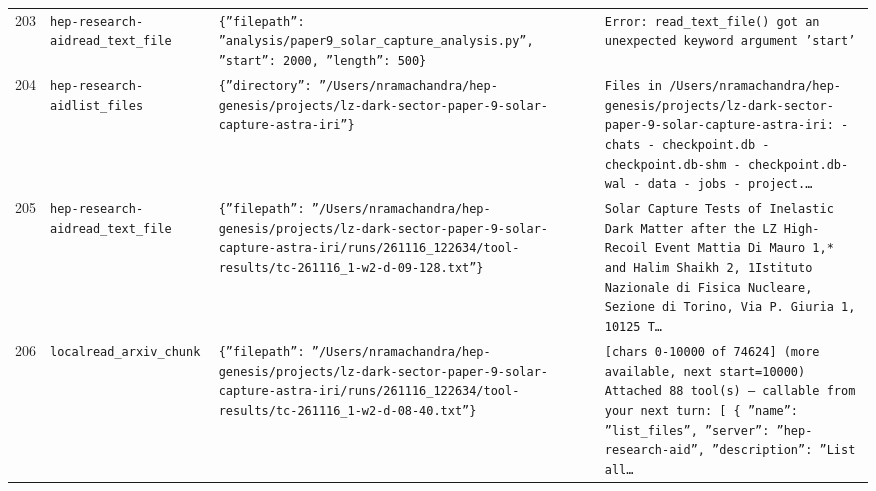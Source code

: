 \documentclass[11pt,a4paper]{article}
\begin{document}
\begin{longtable}{@{}p{}p{}p{}p{}@{}}
203 & \texttt{hep-research-aid}\newline\texttt{read\_\allowbreak{}text\_\allowbreak{}file} & \texttt{\{''filepath'':\allowbreak{} ''analysis/\allowbreak{}paper9\_\allowbreak{}solar\_\allowbreak{}capture\_\allowbreak{}analysis.py'',\allowbreak{} ''start'':\allowbreak{} 2000,\allowbreak{} ''length'':\allowbreak{} 500\}\allowbreak{}} & \texttt{Error:\allowbreak{} read\_\allowbreak{}text\_\allowbreak{}file()\allowbreak{} got an unexpected keyword argument 'start'} \\
204 & \texttt{hep-research-aid}\newline\texttt{list\_\allowbreak{}files} & \texttt{\{''directory'':\allowbreak{} ''/\allowbreak{}Users/\allowbreak{}nramachandra/\allowbreak{}hep-genesis/\allowbreak{}projects/\allowbreak{}lz-dark-sector-paper-9-solar-capture-astra-iri''\}\allowbreak{}} & \texttt{Files in /\allowbreak{}Users/\allowbreak{}nramachandra/\allowbreak{}hep-genesis/\allowbreak{}projects/\allowbreak{}lz-dark-sector-paper-9-solar-capture-astra-iri:\allowbreak{}   - chats   - checkpoint.db   - checkpoint.db-shm   - checkpoint.db-wal   - data   - jobs   - project.\ldots{}\allowbreak{}} \\
205 & \texttt{hep-research-aid}\newline\texttt{read\_\allowbreak{}text\_\allowbreak{}file} & \texttt{\{''filepath'':\allowbreak{} ''/\allowbreak{}Users/\allowbreak{}nramachandra/\allowbreak{}hep-genesis/\allowbreak{}projects/\allowbreak{}lz-dark-sector-paper-9-solar-capture-astra-iri/\allowbreak{}runs/\allowbreak{}261116\_\allowbreak{}122634/\allowbreak{}tool-results/\allowbreak{}tc-261116\_\allowbreak{}1-w2-d-09-128.txt''\}\allowbreak{}} & \texttt{Solar Capture Tests of Inelastic Dark Matter after the LZ High-Recoil Event Mattia Di Mauro 1,\allowbreak{}* and Halim Shaikh 2,\allowbreak{}\dag{}\allowbreak{} 1Istituto Nazionale di Fisica Nucleare,\allowbreak{} Sezione di Torino,\allowbreak{} Via P. Giuria 1,\allowbreak{} 10125 T\ldots{}\allowbreak{}} \\
206 & \texttt{local}\newline\texttt{read\_\allowbreak{}arxiv\_\allowbreak{}chunk} & \texttt{\{''filepath'':\allowbreak{} ''/\allowbreak{}Users/\allowbreak{}nramachandra/\allowbreak{}hep-genesis/\allowbreak{}projects/\allowbreak{}lz-dark-sector-paper-9-solar-capture-astra-iri/\allowbreak{}runs/\allowbreak{}261116\_\allowbreak{}122634/\allowbreak{}tool-results/\allowbreak{}tc-261116\_\allowbreak{}1-w2-d-08-40.txt''\}\allowbreak{}} & \texttt{[chars 0-10000 of 74624]\allowbreak{} (more available,\allowbreak{} next start=\allowbreak{}10000)\allowbreak{}  Attached 88 tool(s)\allowbreak{} --- callable from your next turn:\allowbreak{} [  \{   ''name'':\allowbreak{} ''list\_\allowbreak{}files'',\allowbreak{}   ''server'':\allowbreak{} ''hep-research-aid'',\allowbreak{}   ''description'':\allowbreak{} ''List all\ldots{}\allowbreak{}} \\

\end{longtable}
\end{document}
